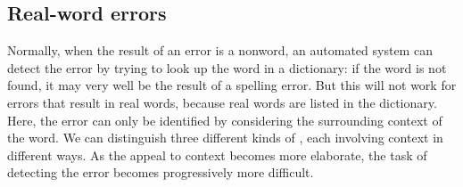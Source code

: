 




\subsection{Real-word errors}
\label{sec:real-word-errors}

 Normally, when the result of an
error is a nonword, an automated system can detect the error by trying
to look up the word in a dictionary: if the word is not found, it may
very well be the result of a spelling error. But this will not work
for errors that result in real words, because real words are listed in the dictionary.  Here, the error can only be identified by considering the surrounding context of the word.
We can distinguish three different kinds of , each involving 
context in different ways.  As the appeal to context becomes more elaborate, the task of
detecting the error becomes progressively more difficult.


